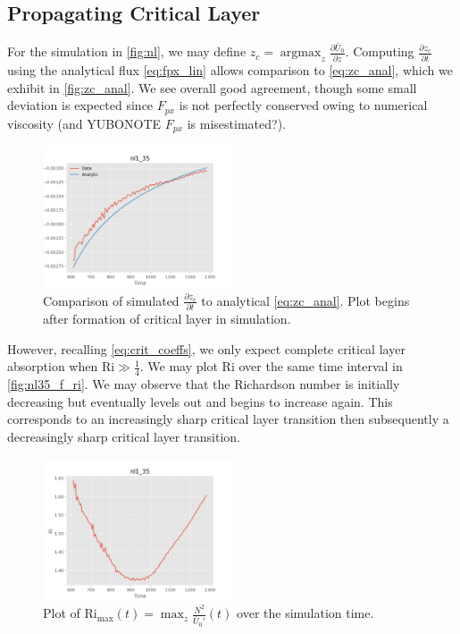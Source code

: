 \documentclass[twocolumn,
        nofootinbib,
        usenames, %
        dvipsnames %
    ]{revtex4-1}%
\newcommand*{\pd}[2]{\frac{\partial#1}{\partial#2}}
\DeclareMathOperator*{\argmax}{argmax}
\begin{document}
\subsection{Propagating Critical Layer}

For the simulation in \autoref{fig:nl}, we may define $z_c = \argmax_z
\pd{\bar{U}_0}{z}$. Computing $\pd{z_c}{t}$ using the analytical flux
\autoref{eq:fpx_lin} allows comparison to \autoref{eq:zc_anal}, which we exhibit
in \autoref{fig:zc_anal}. We see overall good agreement, though some small
deviation is expected since $F_{px}$ is not perfectly conserved owing to
numerical viscosity (and YUBONOTE $F_{px}$ is misestimated?).
\begin{figure}[h]
    \centering
    \includegraphics[width=0.5\textwidth]{plots/nl35_front_v.png}
    \caption{Comparison of simulated $\pd{z_c}{t}$ to analytical
    \autoref{eq:zc_anal}. Plot begins after formation of critical layer in
    simulation.}\label{fig:zc_anal}
\end{figure}

However, recalling \autoref{eq:crit_coeffs}, we only expect complete critical
layer absorption when $\mathrm{Ri} \gg \frac{1}{4}$. We may plot $\mathrm{Ri}$
over the same time interval in \autoref{fig:nl35_f_ri}. We may observe that the
Richardson number is initially decreasing but eventually levels out and
begins to increase again. This corresponds to an increasingly sharp critical
layer transition then subsequently a decreasingly sharp critical layer
transition.
\begin{figure}[h]
    \centering
    \includegraphics[width=0.5\textwidth]{plots/nl35_f_ri.png}
    \caption{Plot of $\mathrm{Ri}_{\max}(t) = \max_z
    \frac{N^2}{\bar{U}_0'}(t)$ over the simulation time.}\label{fig:nl35_f_ri}
\end{figure}
\end{document}
